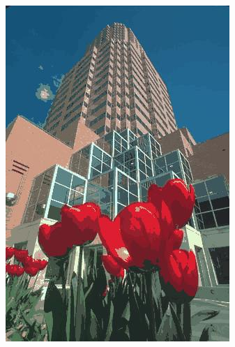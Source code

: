 \documentclass{gapd}
\begin{document}
\begin{figure}[ht]
{\begin{minipage}[t]{0.5\columnwidth}
	\includegraphics[width=\textwidth]{graph/uniform_output_input1_40}
	\end{minipage}
	}
\end{figure}
\end{document}
